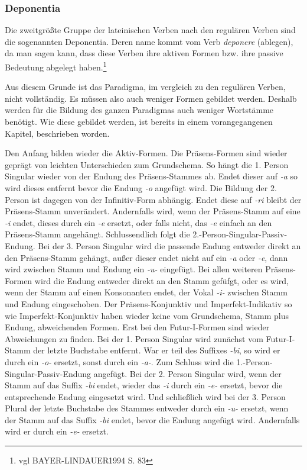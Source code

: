\documentclass[12pt,abstract=on,titlepage,bibliography=totoc,ngerman,listof=totoc]{scrreprt}
\begin{document}
\subsubsection{Deponentia}
Die zweitgrößte Gruppe der lateinischen Verben nach den regulären Verben sind die sogenannten Deponentia. Deren name kommt vom Verb \textit{deponere} (ablegen), da man sagen kann, dass diese Verben ihre aktiven Formen bzw. ihre passive Bedeutung abgelegt haben.\footnote{vgl BAYER-LINDAUER1994 S. 83} \par
Aus diesem Grunde ist das Paradigma, im vergleich zu den regulären Verben, nicht vollständig. Es müssen also auch weniger Formen gebildet werden. Deshalb werden für die Bildung des ganzen Paradigmas auch weniger Wortstämme benötigt. Wie diese gebildet werden, ist bereits in einem vorangegangenen Kapitel, beschrieben worden. \par
Den Anfang bilden wieder die Aktiv-Formen. Die Präsens-Formen sind wieder geprägt von leichten Unterschieden zum Grundschema. So hängt die 1. Person Singular wieder von der Endung des Präsens-Stammes ab. Endet dieser auf \textit{-a} so wird dieses entfernt bevor die Endung \textit{-o} angefügt wird. Die Bildung der 2. Person ist dagegen von der Infinitiv-Form abhängig. Endet diese auf \textit{-ri} bleibt der Präsens-Stamm unverändert. Andernfalls wird, wenn der Präsens-Stamm auf eine \textit{-i} endet, dieses durch ein \textit{-e} ersetzt, oder falls nicht, das \textit{-e} einfach an den Präsens-Stamm angehängt. Schlussendlich folgt die 2.-Person-Singular-Passiv-Endung. Bei der 3. Person Singular wird die passende Endung entweder direkt an den Präsens-Stamm gehängt, außer dieser endet nicht auf ein \textit{-a} oder \textit{-e}, dann wird zwischen Stamm und Endung ein \textit{-u-} eingefügt. Bei allen weiteren Präsens-Formen wird die Endung entweder direkt an den Stamm gefüfgt, oder es wird, wenn der Stamm auf einen Konsonanten endet, der Vokal \textit{-i-} zwischen Stamm und Endung eingeschoben. Der Präsens-Konjunktiv und Imperfekt-Indikativ so wie Imperfekt-Konjunktiv haben wieder keine vom Grundschema, Stamm plus Endung, abweichenden Formen. Erst bei den Futur-I-Formen sind wieder Abweichungen zu finden. Bei der 1. Person Singular wird zunächst vom Futur-I-Stamm der letzte Buchstabe entfernt. War er teil des Suffixes \textit{-bi}, so wird er durch ein \textit{-o-} ersetzt, sonst durch ein \textit{-a-}. Zum Schluss wird die 1.-Person-Singular-Passiv-Endung angefügt. Bei der 2. Person Singular wird, wenn der Stamm auf das Suffix \textit{-bi} endet, wieder das \textit{-i} durch ein \textit{-e-} ersetzt, bevor die entsprechende Endung eingesetzt wird. Und schließlich wird bei der 3. Person Plural der letzte Buchstabe des Stammes entweder durch ein \textit{-u-} ersetzt, wenn der Stamm auf das Suffix \textit{-bi} endet, bevor die Endung angefügt wird. Andernfalls wird er durch ein \textit{-e-} ersetzt. \par
\end{document}
